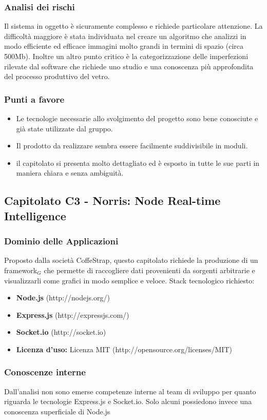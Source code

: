   \subsubsection{Analisi dei rischi}
  Il sistema in oggetto è sicuramente complesso e richiede particolare attenzione. La difficoltà maggiore è stata individuata nel creare un algoritmo che analizzi in modo efficiente ed efficace immagini molto grandi in termini di spazio (circa 500Mb). Inoltre un altro punto critico è la categorizzazione delle imperfezioni rilevate dal software che richiede uno studio e una conoscenza più approfondita del processo produttivo del vetro.
  \subsubsection{Punti a favore}
  \begin{itemize}
  	\item Le tecnologie necessarie allo svolgimento del progetto sono bene conosciute e già state utilizzate dal gruppo.
  	\item Il prodotto da realizzare sembra essere facilmente suddivisibile in moduli.
  	\item il capitolato si presenta molto dettagliato ed è esposto in tutte le sue parti in maniera chiara e senza ambiguità.
  \end{itemize}
\newpage
\subsection{Capitolato C3 - Norris: Node Real-time Intelligence}
  \subsubsection{Dominio delle Applicazioni}
  Proposto dalla società CoffeStrap, questo capitolato richiede la produzione di un framework$_{G}$ che permette di raccogliere dati provenienti da sorgenti arbitrarie e visualizzarli come grafici in modo semplice e veloce. Stack tecnologico richiesto:
  \begin{itemize}
  	\item \textbf{Node.js} (http://nodejs.org/)
  	\item \textbf{Express.js} (http://expressjs.com/)
  	\item \textbf{Socket.io} (http://socket.io)
  	\item \textbf{Licenza d'uso:} Licenza MIT (http://opensource.org/licenses/MIT)
  \end{itemize}
  \subsubsection{Conoscenze interne}
  Dall'analisi non sono emerse competenze interne al team di sviluppo per quanto riguarda le tecnologie Express.js e Socket.io. Solo alcuni possiedono invece una conoscenza superficiale di Node.js
